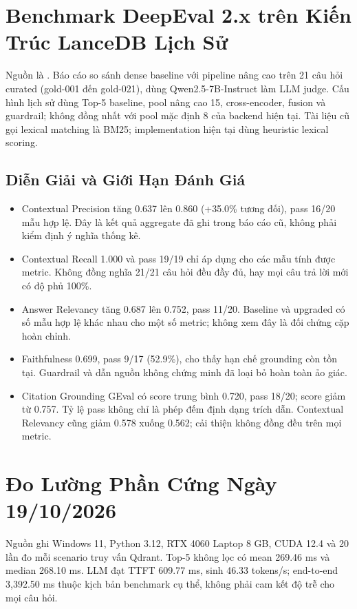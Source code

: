 \section{Benchmark DeepEval 2.x trên Kiến Trúc LanceDB Lịch Sử}
Nguồn là . Báo cáo so sánh dense baseline với pipeline nâng cao trên 21 câu hỏi curated (gold-001 đến gold-021), dùng Qwen2.5-7B-Instruct làm LLM judge. Cấu hình lịch sử dùng Top-5 baseline, pool nâng cao 15, cross-encoder, fusion và guardrail; không đồng nhất với pool mặc định 8 của backend hiện tại. Tài liệu cũ gọi lexical matching là BM25; implementation hiện tại dùng heuristic lexical scoring.



\subsection{Diễn Giải và Giới Hạn Đánh Giá}
\begin{itemize}
\item Contextual Precision tăng 0.637 lên 0.860 (+35.0\% tương đối), pass 16/20 mẫu hợp lệ. Đây là kết quả aggregate đã ghi trong báo cáo cũ, không phải kiểm định ý nghĩa thống kê.
\item Contextual Recall 1.000 và pass 19/19 chỉ áp dụng cho các mẫu tính được metric. Không đồng nghĩa 21/21 câu hỏi đều đầy đủ, hay mọi câu trả lời mới có độ phủ 100\%.
\item Answer Relevancy tăng 0.687 lên 0.752, pass 11/20. Baseline và upgraded có số mẫu hợp lệ khác nhau cho một số metric; không xem đây là đối chứng cặp hoàn chỉnh.
\item Faithfulness 0.699, pass 9/17 (52.9\%), cho thấy hạn chế grounding còn tồn tại. Guardrail và dẫn nguồn không chứng minh đã loại bỏ hoàn toàn ảo giác.
\item Citation Grounding GEval có score trung bình 0.720, pass 18/20; score giảm từ 0.757. Tỷ lệ pass không chỉ là phép đếm định dạng trích dẫn. Contextual Relevancy cũng giảm 0.578 xuống 0.562; cải thiện không đồng đều trên mọi metric.
\end{itemize}

\section{Đo Lường Phần Cứng Ngày 19/10/2026}
Nguồn  ghi Windows 11, Python 3.12, RTX 4060 Laptop 8 GB, CUDA 12.4 và 20 lần đo mỗi scenario truy vấn Qdrant. Top-5 không lọc có mean 269.46 ms và median 268.10 ms. LLM đạt TTFT 609.77 ms, sinh 46.33 tokens/s; end-to-end 3,392.50 ms thuộc kịch bản benchmark cụ thể, không phải cam kết độ trễ cho mọi câu hỏi.

